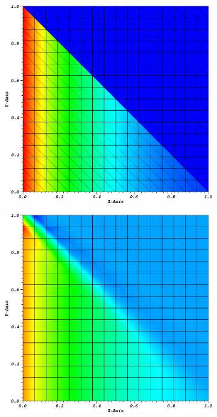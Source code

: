 \begin{figure}
\centering
{
	\begin{subfigure}[b]{0.485\textwidth}
		\centering
		\label{subfig::PA_Mesh_Tri}
		\includegraphics[width=\textwidth]{figures/sec_BF/PALeftSol_Tri.png}
	\end{subfigure}
	\hfill
	\begin{subfigure}[b]{0.485\textwidth}
		\centering
		\label{subfig::PA_Mesh_Cart}
		\includegraphics[width=\textwidth]{figures/sec_BF/PALeftSol_Cart.png}

\end{subfigure}}
\end{figure}
